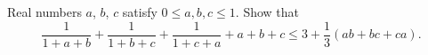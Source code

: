 Real numbers $a$, $b$, $c$ satisfy $0\le a,b,c\le1$. Show that
\[
\dfrac{1}{1+a+b}+\dfrac{1}{1+b+c}+\dfrac{1}{1+c+a}+a+b+c\le3+\dfrac{1}{3}(ab+bc+ca).
\]
